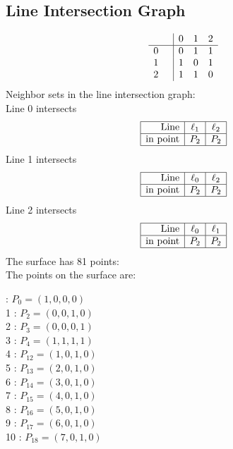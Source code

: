 \documentclass{article}
\begin{document}
{\subsection*{Line Intersection Graph}
{\arraycolsep=1pt
$$
\begin{array}{rr|*{3}r}
 &  & 0 & 1 & 2\\
\hline
0 &  & 0 & 1 & 1\\
1 &  & 1 & 0 & 1\\
2 &  & 1 & 1 & 0\\
\end{array}
$$
}%
Neighbor sets in the line intersection graph:\\
Line 0 intersects 
$$
\begin{array}{|r*{2}{|c}|}
\hline
\mbox{Line}  & \ell_{1} & \ell_{2}\\
\hline
\mbox{in point}  & P_{2} & P_{2}\\
\hline
\end{array}
$$
Line 1 intersects 
$$
\begin{array}{|r*{2}{|c}|}
\hline
\mbox{Line}  & \ell_{0} & \ell_{2}\\
\hline
\mbox{in point}  & P_{2} & P_{2}\\
\hline
\end{array}
$$
Line 2 intersects 
$$
\begin{array}{|r*{2}{|c}|}
\hline
\mbox{Line}  & \ell_{0} & \ell_{1}\\
\hline
\mbox{in point}  & P_{2} & P_{2}\\
\hline
\end{array}
$$
The surface has 81 points:\\
The points on the surface are:\\
\begin{multicols}{3}
 : $P_{0}=( 1, 0, 0, 0 )$\\
1 : $P_{2}=( 0, 0, 1, 0 )$\\
2 : $P_{3}=( 0, 0, 0, 1 )$\\
3 : $P_{4}=( 1, 1, 1, 1 )$\\
4 : $P_{12}=( 1, 0, 1, 0 )$\\
5 : $P_{13}=( 2, 0, 1, 0 )$\\
6 : $P_{14}=( 3, 0, 1, 0 )$\\
7 : $P_{15}=( 4, 0, 1, 0 )$\\
8 : $P_{16}=( 5, 0, 1, 0 )$\\
9 : $P_{17}=( 6, 0, 1, 0 )$\\
10 : $P_{18}=( 7, 0, 1, 0 )$\\

\end{multicols}}
\end{document}
